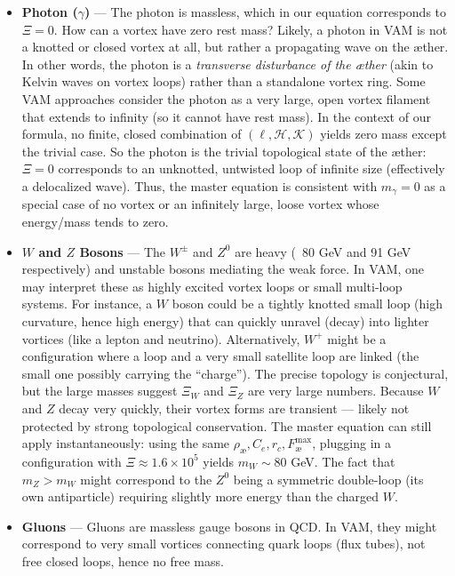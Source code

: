 \documentclass[11pt]{article}
\begin{document}
    \begin{itemize}
        \item \textbf{Photon ($\gamma$)} — The photon is massless, which in our equation corresponds to $\Xi=0$. How can a vortex have zero rest mass? Likely, a photon in VAM is not a knotted or closed vortex at all, but rather a propagating wave on the æther. In other words, the photon is a \textit{transverse disturbance of the æther} (akin to Kelvin waves on vortex loops) rather than a standalone vortex ring. Some VAM approaches consider the photon as a very large, open vortex filament that extends to infinity (so it cannot have rest mass). In the context of our formula, no finite, closed combination of $(\ell,\mathcal{H},\mathcal{K})$ yields zero mass except the trivial case. So the photon is the trivial topological state of the æther: $\Xi=0$ corresponds to an unknotted, untwisted loop of infinite size (effectively a delocalized wave). Thus, the master equation is consistent with $m_\gamma=0$ as a special case of no vortex or an infinitely large, loose vortex whose energy/mass tends to zero.

        \item \textbf{$W$ and $Z$ Bosons} — The $W^\pm$ and $Z^0$ are heavy (~80 GeV and 91 GeV respectively) and unstable bosons mediating the weak force. In VAM, one may interpret these as highly excited vortex loops or small multi-loop systems. For instance, a $W$ boson could be a tightly knotted small loop (high curvature, hence high energy) that can quickly unravel (decay) into lighter vortices (like a lepton and neutrino). Alternatively, $W^+$ might be a configuration where a loop and a very small satellite loop are linked (the small one possibly carrying the “charge”). The precise topology is conjectural, but the large masses suggest $\Xi_{W}$ and $\Xi_{Z}$ are very large numbers. Because $W$ and $Z$ decay very quickly, their vortex forms are transient — likely not protected by strong topological conservation. The master equation can still apply instantaneously: using the same $\rho_{\text{\ae}},C_e,r_c,F^{\max}_{\text{\ae}}$, plugging in a configuration with $\Xi \approx 1.6 \times 10^{5}$ yields $m_W \sim 80$ GeV. The fact that $m_Z > m_W$ might correspond to the $Z^0$ being a symmetric double-loop (its own antiparticle) requiring slightly more energy than the charged $W$.

        \item \textbf{Gluons} — Gluons are massless gauge bosons in QCD. In VAM, they might correspond to very small vortices connecting quark loops (flux tubes), not free closed loops, hence no free mass.


\end{itemize}
\end{document}
